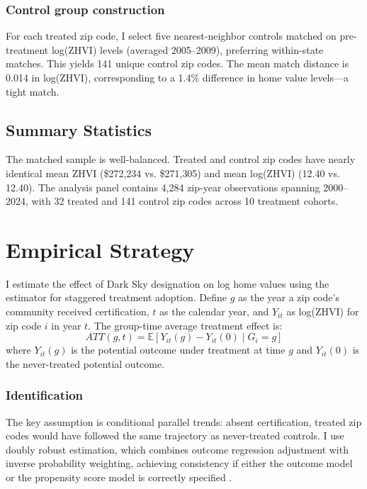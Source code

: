 \documentclass[12pt]{article}
\newcommand{\E}{\mathbb{E}}
\begin{document}
\subsubsection*{Control group construction} For each treated zip code, I select five nearest-neighbor controls matched on pre-treatment log(ZHVI) levels (averaged 2005--2009), preferring within-state matches. This yields 141 unique control zip codes. The mean match distance is 0.014 in log(ZHVI), corresponding to a 1.4\% difference in home value levels---a tight match.

\subsection{Summary Statistics}



The matched sample is well-balanced. Treated and control zip codes have nearly identical mean ZHVI (\$272{,}234 vs. \$271{,}305) and mean log(ZHVI) (12.40 vs. 12.40). The analysis panel contains 4{,}284 zip-year observations spanning 2000--2024, with 32 treated and 141 control zip codes across 10 treatment cohorts.

\section{Empirical Strategy}

I estimate the effect of Dark Sky designation on log home values using the \citet{callaway2021difference} estimator for staggered treatment adoption. Define $g$ as the year a zip code's community received certification, $t$ as the calendar year, and $Y_{it}$ as log(ZHVI) for zip code $i$ in year $t$. The group-time average treatment effect is:
\begin{equation}
ATT(g,t) = \E[Y_{it}(g) - Y_{it}(0) \mid G_i = g]
\end{equation}
where $Y_{it}(g)$ is the potential outcome under treatment at time $g$ and $Y_{it}(0)$ is the never-treated potential outcome.

\subsubsection*{Identification} The key assumption is conditional parallel trends: absent certification, treated zip codes would have followed the same trajectory as never-treated controls. I use doubly robust estimation, which combines outcome regression adjustment with inverse probability weighting, achieving consistency if either the outcome model or the propensity score model is correctly specified \citep{sant2020doubly}.
\end{document}

